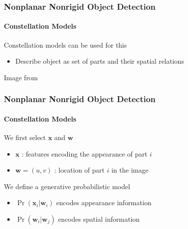 \documentclass[xetex,professionalfont]{beamer}
\renewcommand{\vec}[1]{\ensuremath{\mathbf{#1}}}
\newcommand{\vw}{\vec{w}}
\newcommand{\vx}{\vec{x}}
\renewcommand\emph[1]{\textcolor{tuwcvl_inf_red}{#1}}
\begin{document}

\begin{frame}
\frametitle{Nonplanar Nonrigid Object Detection}
\framesubtitle{Constellation Models}

\emph{Constellation models} can be used for this
\begin{itemize}
    \item Describe object as set of parts and their spatial relations
\end{itemize}

\medskip
\begin{center}
    {\centering Image from \cite{fischler1973}}
\end{center}

\end{frame}


\begin{frame}
\frametitle{Nonplanar Nonrigid Object Detection}
\framesubtitle{Constellation Models}

We first select $\vx$ and $\vw$
\begin{itemize}
    \item $\vx$ : features encoding the appearance of part $i$ %
    \item $\vw=(u,v)$ : location of part $i$ in the image
\end{itemize}

\bigskip
We define a generative probabilistic model
\begin{itemize}
    \item $\Pr(\vx_i|\vw_i)$ encodes appearance information
    \item $\Pr(\vw_i|\vw_j)$ encodes spatial information
\end{itemize}


\end{frame}
\end{document}
